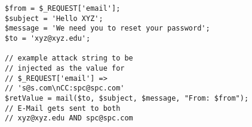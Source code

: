 \begin{lstlisting}
$from = $_REQUEST['email'];
$subject = 'Hello XYZ';
$message = 'We need you to reset your password';
$to = 'xyz@xyz.edu';

// example attack string to be 
// injected as the value for
// $_REQUEST['email'] => 
// 's@s.com\nCC:spc@spc.com'
$retValue = mail($to, $subject, $message, "From: $from");
// E-Mail gets sent to both 
// xyz@xyz.edu AND spc@spc.com
\end{lstlisting}